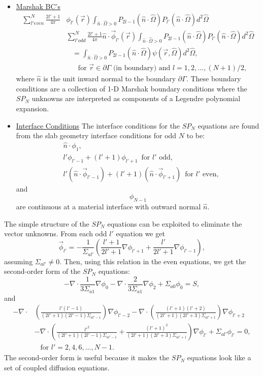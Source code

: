 \documentclass[12pt]{article}
\newcommand{\omvec}{\ensuremath{\hat{\Omega}}}
\begin{document}
\begin{itemize}
\item \underline{Marshak BC's} 
\[
\begin{split}
\sum_{l' even}^N\frac{2l'+1}{4\pi}&\phi_{l'}(\vec r)\int_{\hat n\cdot\omvec>0}P_{2l-1}(\hat n\cdot\omvec)P_{l'}(\hat n\cdot\omvec)d^2\omvec \\
& \sum_{l' odd}^N\frac{2l'+1}{4\pi}\hat n\cdot\vec\phi_{l'}(\vec r)\int_{\hat n\cdot\omvec>0}P_{2l-1}(\hat n\cdot\omvec)P_{l'}(\hat n\cdot\omvec)d^2\omvec \\
&\,\,\,\,\,=\int_{\hat n\cdot\omvec>0}P_{2l-1}(\hat n\cdot\omvec)\psi(\vec r,\omvec)d^2\omvec,\\
&\,\,\,\,\,\,\,\,\,\, \text{for $\vec r \in \partial\Gamma$ (in boundary) and $l=1,2,...,(N+1)/2$,} 
\end{split}
\]
where $\hat n$ is the unit inward normal to the boundary $\partial\Gamma$. These boundary conditions are a collection of 1-D Marshak
boundary conditions where the $SP_N$ unknowns are interpreted as
components of a Legendre polynomial expansion.

\item \underline{Interface Conditions} 
The interface conditions for the $SP_N$ equations are found from
the slab geometry interface conditions for odd $N$ to be:
\[
\begin{split}
&\hat n \cdot\phi_1, \\
&l'\phi_{l'-1}+(l'+1)\phi_{l'+1} \,\,\, \text{for $l'$ odd,}\\
&l'(\hat n\cdot\vec\phi_{l'-1})+(l'+1)(\hat n\cdot\vec\phi_{l'+1}) \,\,\, \text{for $l'$ even,}
\end{split}
\]
and
\[
\phi_{N-1}
\]
are continuous at a material interface with outward normal $\hat n$.
\end{itemize}
The simple structure of the $SP_N$ equations can be exploited
to eliminate the vector unknowns. From each odd $l'$ equation we
get 
\[
\vec\phi_{l'}=-\frac{1}{\Sigma_{al'}}\left(\frac{l'+1}{2l'+1}\nabla\phi_{l'+1}+\frac{l'}{2l'+1}\nabla\phi_{l'-1}\right),
\]
assuming $\Sigma_{al'}\neq 0$. Then, using this relation in the even equations,
we get the second-order form of the $SP_N$ equations:
\[
-\nabla\cdot\frac{1}{3\Sigma_{a1}}\nabla\phi_0-\nabla\cdot\frac{2}{3\Sigma_{a1}}\nabla\phi_2+\Sigma_{a0}\phi_0 = S,
\]
and
\[
\begin{split}
-\nabla\cdot&\left(\frac{l'(l'-1)}{(2l'+1)(2l'-1)\Sigma_{al'-1}}\right)\nabla\phi_{l'-2}-\nabla\cdot\left(\frac{(l'+1)(l'+2)}{(2l'+1)(2l'+3)\Sigma_{al'+1}}\right)\nabla\phi_{l'+2}\\
&-\nabla\cdot\left(\frac{l'^2}{(2l'+1)(2l'-1)\Sigma_{al'-1}}+\frac{(l'+1)^2}{(2l'+1)(2l'+3)\Sigma_{al'+1}}\right)\nabla\phi_{l'} +\Sigma_{al'}\phi_{l'} = 0,\\
&\,\,\,\,\, \text{for $l'=2,4,6,...,N-1$.}
\end{split}
\] 
The second-order form is useful because it makes the $SP_N$ equations
look like a set of coupled diffusion equations. 
\end{document}
